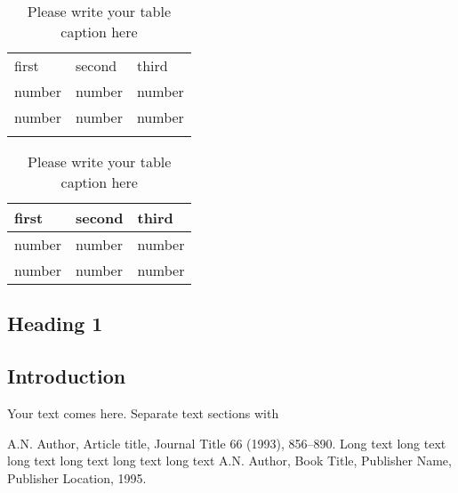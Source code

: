 \documentclass{akabook}
\theoremstyle{definition}
\begin{document}


\begin{table}
\caption{Please write your table caption here}
\label{tab:1}       %
\begin{tabular}{lll}
\hline\noalign{\smallskip}
first & second & third  \\
\noalign{\smallskip}\hline\noalign{\smallskip}
number & number & number \\
number & number & number \\
\noalign{\smallskip}\hline
\end{tabular}
\end{table}

\begin{table}
\caption{Please write your table caption here}
\label{tab:1}       %
\begin{tabular}{lll}
\hline
first & second & third  \\
\hline
number & number & number \\
number & number & number \\
\hline
\end{tabular}
\end{table}



\begin{appendix}
\chapter{Heading 1}

\section{Introduction}
Your text comes here. Separate text sections with
\end{appendix}

\begin{thebibliography}{}
%
%

A.N. Author, Article title, Journal Title 66 (1993), 856--890.
Long text long text long text long text long text long text
A.N. Author, Book Title, Publisher Name, Publisher Location, 1995.
\end{thebibliography}

\printindex

\tableofcontents
\end{document}
